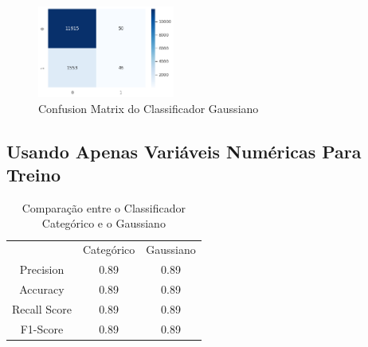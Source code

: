 \documentclass[conference]{IEEEtran}
\begin{document}
\begin{figure}[H]
    \centerline{\includegraphics[width=0.4\textwidth]{IMGS/cm-gnb-age-only.png}}
    \caption{\label{fig:cm2-gnb}Confusion Matrix do Classificador Gaussiano}
\end{figure}

\subsection{Usando Apenas Variáveis Numéricas Para Treino}

\begin{table}[H]
	\centering
    \caption{\label{tab:cr3-gt} Comparação entre o Classificador Categórico e o Gaussiano}
    \begin{small}
        \begin{tabular}{ccc}
        	\\
        	\\
            \hline
                                    & Categórico       & Gaussiano\\
            \hline
            Precision               & 0.89             & 0.89\\
            Accuracy                & 0.89             & 0.89\\
            Recall Score            & 0.89             & 0.89\\
            F1-Score                & 0.89             & 0.89\\
            
            \hline
        \end{tabular}
    \end{small}
\end{table}
\end{document}
